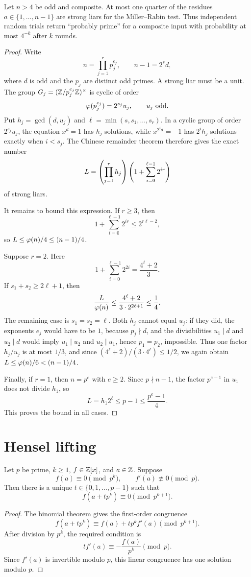 \begin{thm}
Let $n>4$ be odd and composite.  At most one quarter of the residues $a\in\{1,\ldots,n-1\}$ are strong liars for the Miller--Rabin test.  Thus independent random trials return ``probably prime'' for a composite input with probability at most $4^{-k}$ after $k$ rounds.
\end{thm}
\begin{proof}
Write
\[
 n=\prod_{j=1}^r p_j^{e_j},\qquad n-1=2^s d,
\]
where $d$ is odd and the $p_j$ are distinct odd primes.  A strong liar must be a unit.  The group
$G_j=(\Z/p_j^{e_j}\Z)^\times$ is cyclic of order
\[
 \totient(p_j^{e_j})=2^{s_j}u_j,
 \qquad u_j\text{ odd}.
\]
Put $h_j=\gcd(d,u_j)$ and
$\ell=\min(s,s_1,\ldots,s_r)$.  In a cyclic group of order $2^{s_j}u_j$, the equation $x^d=1$ has $h_j$ solutions, while
$x^{2^i d}=-1$ has $2^i h_j$ solutions exactly when $i<s_j$.  The Chinese remainder theorem therefore gives the exact number
\[
 L=\paren*{\prod_{j=1}^r h_j}
 \left(1+\sum_{i=0}^{\ell-1}2^{ir}\right)
\]
of strong liars.

It remains to bound this expression.  If $r\ge3$, then
\[
 1+\sum_{i=0}^{\ell-1}2^{ir}\le 2^{r\ell-2},
\]
so $L\le\totient(n)/4\le(n-1)/4$.

Suppose $r=2$.  Here
\[
 1+\sum_{i=0}^{\ell-1}2^{2i}=\frac{4^\ell+2}{3}.
\]
If $s_1+s_2\ge2\ell+1$, then
\[
 \frac{L}{\totient(n)}
 \le \frac{4^\ell+2}{3\cdot 2^{2\ell+1}}
 \le\frac14.
\]
The remaining case is $s_1=s_2=\ell$.  Both $h_j$ cannot equal $u_j$: if they did, the exponents $e_j$ would have to be $1$, because $p_j\nmid d$, and the divisibilities $u_1\mid d$ and $u_2\mid d$ would imply $u_1\mid u_2$ and $u_2\mid u_1$, hence $p_1=p_2$, impossible.  Thus one factor $h_j/u_j$ is at most $1/3$, and since $(4^\ell+2)/(3\cdot4^\ell)\le1/2$, we again obtain $L\le\totient(n)/6<(n-1)/4$.

Finally, if $r=1$, then $n=p^e$ with $e\ge2$.  Since $p\nmid n-1$, the factor $p^{e-1}$ in $u_1$ does not divide $h_1$, so
\[
 L=h_1 2^\ell\le p-1\le\frac{p^e-1}{4}.
\]
This proves the bound in all cases.
\end{proof}

\section{Hensel lifting}

\begin{thm}
Let $p$ be prime, $k\ge1$, $f\in\Z[x]$, and $a\in\Z$.  Suppose
\[
 f(a)\equiv0\pmod{p^k},
 \qquad
 f'(a)\not\equiv0\pmod p.
\]
Then there is a unique $t\in\{0,1,\ldots,p-1\}$ such that
\[
 f(a+tp^k)\equiv0\pmod{p^{k+1}}.
\]
\end{thm}
\begin{proof}
The binomial theorem gives the first-order congruence
\[
 f(a+tp^k)\equiv f(a)+tp^k f'(a)\pmod{p^{k+1}}.
\]
After division by $p^k$, the required condition is
\[
 t f'(a)\equiv-\frac{f(a)}{p^k}\pmod p.
\]
Since $f'(a)$ is invertible modulo $p$, this linear congruence has one solution modulo $p$.
\end{proof}

